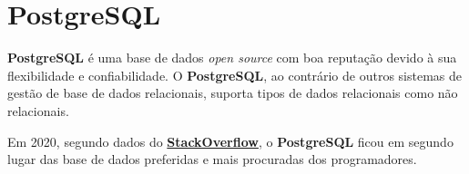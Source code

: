 \section{PostgreSQL}

\begin{minipage}[t]{.3\textwidth}
\end{minipage}
\begin{minipage}[t]{.7\textwidth}
	\minipagerestore
	\textbf{PostgreSQL} é uma base de dados \textit{open source} com boa reputação devido à sua flexibilidade e confiabilidade. O \textbf{PostgreSQL}, ao contrário de outros sistemas de gestão de base de dados relacionais, suporta tipos de dados relacionais como não relacionais.
	
	Em 2020, segundo dados do \href{https://insights.stackoverflow.com/survey/2020#technology-most-loved-dreaded-and-wanted-databases-loved4}{\textbf{StackOverflow}}, o \textbf{PostgreSQL} ficou em segundo lugar das base de dados preferidas e mais procuradas dos programadores.
\end{minipage}

